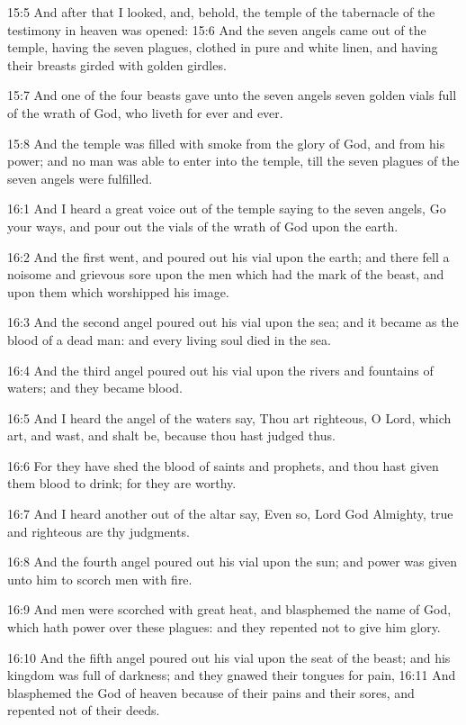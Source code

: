 15:5 And after that I looked, and, behold, the temple of the tabernacle of the testimony in heaven was opened: 15:6 And the seven angels came out of the temple, having the seven plagues, clothed in pure and white linen, and having their breasts girded with golden girdles.

15:7 And one of the four beasts gave unto the seven angels seven golden vials full of the wrath of God, who liveth for ever and ever.

15:8 And the temple was filled with smoke from the glory of God, and from his power; and no man was able to enter into the temple, till the seven plagues of the seven angels were fulfilled.

16:1 And I heard a great voice out of the temple saying to the seven angels, Go your ways, and pour out the vials of the wrath of God upon the earth.

16:2 And the first went, and poured out his vial upon the earth; and there fell a noisome and grievous sore upon the men which had the mark of the beast, and upon them which worshipped his image.

16:3 And the second angel poured out his vial upon the sea; and it became as the blood of a dead man: and every living soul died in the sea.

16:4 And the third angel poured out his vial upon the rivers and fountains of waters; and they became blood.

16:5 And I heard the angel of the waters say, Thou art righteous, O Lord, which art, and wast, and shalt be, because thou hast judged thus.

16:6 For they have shed the blood of saints and prophets, and thou hast given them blood to drink; for they are worthy.

16:7 And I heard another out of the altar say, Even so, Lord God Almighty, true and righteous are thy judgments.

16:8 And the fourth angel poured out his vial upon the sun; and power was given unto him to scorch men with fire.

16:9 And men were scorched with great heat, and blasphemed the name of God, which hath power over these plagues: and they repented not to give him glory.

16:10 And the fifth angel poured out his vial upon the seat of the beast; and his kingdom was full of darkness; and they gnawed their tongues for pain, 16:11 And blasphemed the God of heaven because of their pains and their sores, and repented not of their deeds.

